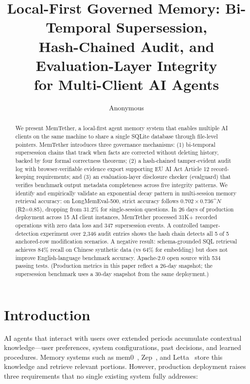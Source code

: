 \documentclass{article}
\title{Local-First Governed Memory: Bi-Temporal Supersession,\\ Hash-Chained Audit, and Evaluation-Layer Integrity\\ for Multi-Client AI Agents}
\author{Anonymous}
\date{}
\begin{document}
\maketitle

\begin{abstract}
We present MemTether, a local-first agent memory system that enables multiple AI clients on the same machine to share a single SQLite database through file-level pointers. MemTether introduces three governance mechanisms: (1) bi-temporal supersession chains that track when facts are corrected without deleting history, backed by four formal correctness theorems; (2) a hash-chained tamper-evident audit log with browser-verifiable evidence export supporting EU AI Act Article 12 record-keeping requirements; and (3) an evaluation-layer disclosure checker (evalguard) that verifies benchmark output metadata completeness across five integrity patterns. We identify and empirically validate an exponential decay pattern in multi-session memory retrieval accuracy: on LongMemEval-500, strict accuracy follows $0.702 \times 0.736\^N$ (R\^2=0.85), dropping from 31.2\% for single-session questions. In 26 days of production deployment across 15 AI client instances, MemTether processed 31K+ recorded operations with zero data loss and 347 supersession events. A controlled tamper-detection experiment over 2,346 audit entries shows the hash chain detects all 5 of 5 anchored-row modification scenarios. A negative result: schema-grounded SQL retrieval achieves 84\% recall on Chinese synthetic data (vs 64\% for embedding) but does not improve English-language benchmark accuracy. Apache-2.0 open source with 534 passing tests. (Production metrics in this paper reflect a 26-day snapshot; the supersession benchmark uses a 30-day snapshot from the same deployment.)
\end{abstract}

\section{Introduction}
\label{sec:intro}

AI agents that interact with users over extended periods accumulate contextual knowledge---user preferences, system configurations, past decisions, and learned procedures. Memory systems such as mem0~\citep{mem0}, Zep~\citep{zep}, and Letta~\citep{letta} store this knowledge and retrieve relevant portions. However, production deployment raises three requirements that no single existing system fully addresses:
\end{document}
